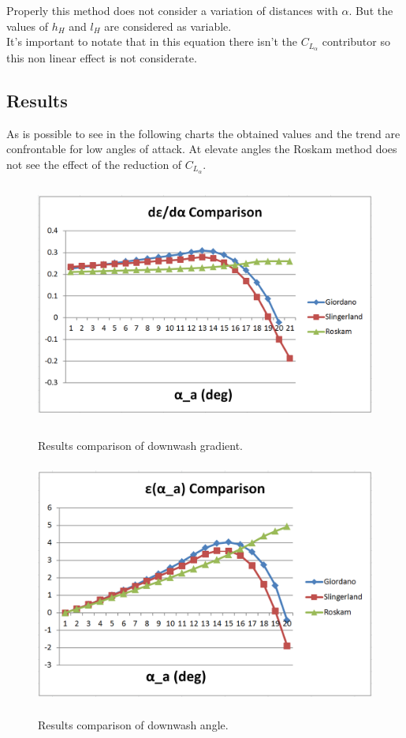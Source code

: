 Properly this method does not consider a variation of distances with $\alpha$. But the values of $h_H$ and $l_H$ are considered as variable. \\
It's important to notate that in this equation there isn't the $C_{L_{\alpha}}$ contributor so this non linear effect is not considerate. 

\subsection{ Results}

As is possible to see in the following charts the obtained values and the trend are confrontable for low angles of attack. At elevate angles the Roskam method does not see the effect of the reduction of $C_{L_{\alpha}}$.

\begin{figure}[H]
\centering
{\includegraphics[height=8cm]{immagini/downwashcomparison1}} 
\caption{Results comparison of downwash gradient.}
\label{comparisondownwash}
\end{figure} 

\begin{figure}[H]
\centering
{\includegraphics[height=8cm]{immagini/downwashcomparison2}} 
\caption{Results comparison of downwash angle.}
\label{comparisondownwash2}
\end{figure} 

